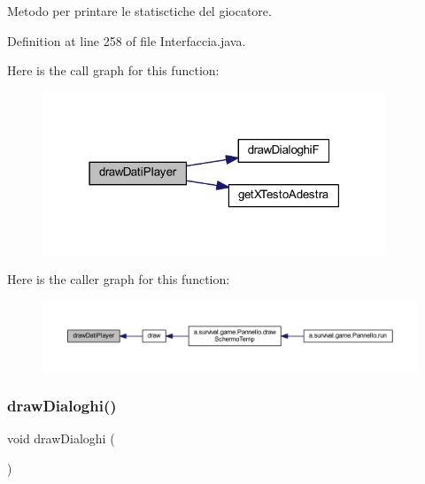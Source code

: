 Metodo per printare le statisctiche del giocatore. 



Definition at line 258 of file Interfaccia.\+java.

Here is the call graph for this function\+:
\nopagebreak
\begin{figure}[H]
\begin{center}
\leavevmode
\includegraphics[width=291pt]{classa_1_1survival_1_1game_1_1_interfaccia_aa9a8046a21bf4083e12263a078701107_cgraph}
\end{center}
\end{figure}
Here is the caller graph for this function\+:
\nopagebreak
\begin{figure}[H]
\begin{center}
\leavevmode
\includegraphics[width=350pt]{classa_1_1survival_1_1game_1_1_interfaccia_aa9a8046a21bf4083e12263a078701107_icgraph}
\end{center}
\end{figure}
\mbox{\label{classa_1_1survival_1_1game_1_1_interfaccia_a07761ecd195353aa0f33107b57c3c852}} 
\subsubsection{\texorpdfstring{draw\+Dialoghi()}{drawDialoghi()}}
{\footnotesize\ttfamily void draw\+Dialoghi (\begin{DoxyParamCaption}{ }\end{DoxyParamCaption})}



